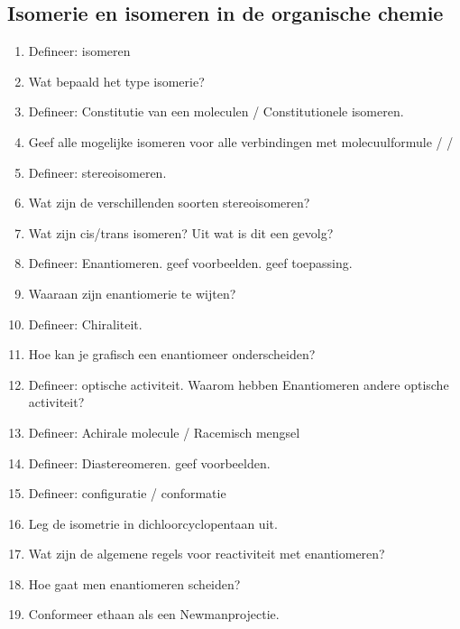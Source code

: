 \documentclass[a4paper,12pt]{article}
\begin{document}
\begin{enumerate}
        \subsection*{Isomerie en isomeren in de organische chemie}
        \begin{enumerate}
            \item Defineer: isomeren
            \item Wat bepaald het type isomerie?
            \item Defineer: Constitutie van een moleculen / Constitutionele isomeren.
            \item Geef alle mogelijke isomeren voor alle verbindingen met molecuulformule  /  / 
            \item Defineer: stereoisomeren. 
            \item Wat zijn de verschillenden soorten stereoisomeren? 
            \item Wat zijn cis/trans isomeren? Uit wat is dit een gevolg?
            \item Defineer: Enantiomeren. geef voorbeelden. geef toepassing.
            \item Waaraan zijn enantiomerie te wijten?
            \item Defineer: Chiraliteit. 
            \item Hoe kan je grafisch een enantiomeer onderscheiden?
            \item Defineer: optische activiteit. Waarom hebben Enantiomeren andere optische activiteit?
            \item Defineer: Achirale molecule / Racemisch mengsel
            \item Defineer: Diastereomeren. geef voorbeelden.
            \item Defineer: configuratie / conformatie
            \item Leg de isometrie in dichloorcyclopentaan uit.
            \item Wat zijn de algemene regels voor reactiviteit met enantiomeren?
            \item Hoe gaat men enantiomeren scheiden?
            \item Conformeer ethaan als een Newmanprojectie.
        \end{enumerate}
    \end{enumerate}
\end{document}
